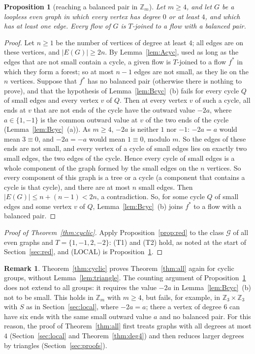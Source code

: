 \documentclass[11pt]{article}
\newtheorem{proposition}[theorem]{Proposition}
\theoremstyle{definition}
\newtheorem{remark}[theorem]{Remark}
\newcommand{\Z}{\mathbb{Z}}
\newcommand{\cG}{\mathcal{G}}
\begin{document}
\begin{proposition}[reaching a balanced pair in $\Z_m$]\label{prop:localcyc}
Let $m\ge 4$, and let $G$ be a loopless even graph in which every vertex has degree $0$ or at least $4$, and which has at least one edge. Every flow of $G$ is $T$-joined to a flow with a balanced pair.
\end{proposition}
\begin{proof}
Let $n\ge 1$ be the number of vertices of degree at least $4$; all edges are on these vertices, and $|E(G)|\ge 2n$.
By Lemma~\ref{lem:Acyc}, used as long as the edges that are not small contain a cycle, a given flow is $T$-joined to a flow
$f^*$ in which they form a forest; so at most $n-1$ edges are not small, as they lie on the $n$ vertices. Suppose that
$f^*$ has no balanced pair (otherwise there is nothing to prove), and that the hypothesis of Lemma~\ref{lem:Bcyc}~(b) fails for every cycle $Q$ of small
edges and every vertex $v$ of $Q$. Then at every vertex $v$ of such a cycle, all ends at $v$ that are not ends of the cycle have the outward
value $-2a$, where $a\in\{1,-1\}$ is the common outward value at $v$ of the two ends of the cycle
(Lemma~\ref{lem:Bcyc}~(a)). As $m\ge 4$, $-2a$ is neither $1$ nor $-1$: $-2a=a$ would mean $3\equiv 0$, and $-2a=-a$ would
mean $1\equiv 0$, modulo $m$. So the edges of these ends are not small, and every vertex of a cycle of small edges lies
on exactly two small edges, the two edges of the cycle. Hence every cycle of small edges is a whole component of the graph formed by the small edges on the $n$
vertices. So every component of this graph is a tree or a cycle (a component that contains a cycle is that cycle), and
there are at most $n$ small edges. Then
$|E(G)|\le n+(n-1)<2n$, a contradiction. So, for some cycle $Q$ of small edges and some vertex $v$ of $Q$,
Lemma~\ref{lem:Bcyc}~(b) joins $f^*$ to a flow with a balanced pair.
\end{proof}

\begin{proof}[Proof of Theorem~\ref{thm:cyclic}]
Apply Proposition~\ref{prop:red} to the class $\cG$ of all even graphs and $T=\{1,-1,2,-2\}$: \textup{(T1)} and
\textup{(T2)} hold, as noted at the start of Section~\ref{sec:red}, and \textup{(LOCAL)} is
Proposition~\ref{prop:localcyc}.
\end{proof}

\begin{remark}\label{rem:noncyclic}
Theorem~\ref{thm:cyclic} proves Theorem~\ref{thm:all} again for cyclic groups, without Lemma~\ref{lem:triangle}. The
counting argument of Proposition~\ref{prop:localcyc} does not extend to all groups:
it requires the value $-2a$ in Lemma~\ref{lem:Bcyc}~(b) not to be small. This holds in $\Z_m$ with $m\ge 4$, but fails,
for example, in $\Z_3\times\Z_3$ with $S$ as in Section~\ref{sec:local}, where $-2a=a$; there a vertex of degree $6$ can have six ends
with the same small outward value $a$ and no balanced pair. For this reason, the proof of Theorem~\ref{thm:all} first treats graphs with all degrees at most $4$
(Section~\ref{sec:local} and Theorem~\ref{thm:deg4}) and then reduces larger degrees by triangles
(Section~\ref{sec:proofs}).
\end{remark}
\end{document}
